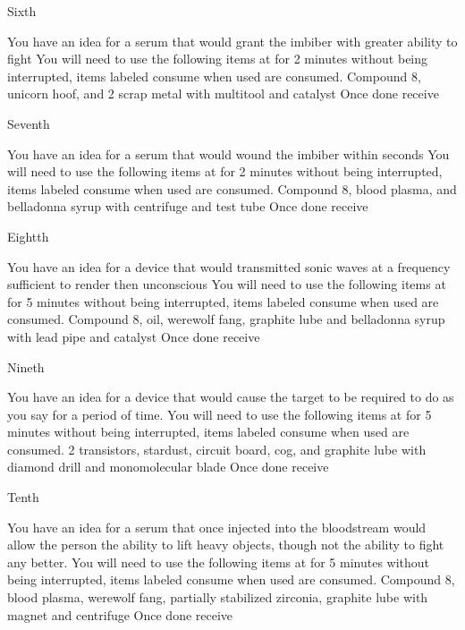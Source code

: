 \documentclass[greennotebook]{guildcamp3} %
\begin{document}
\begin{page}{Sixth}
	
	You have an idea for a serum that would grant the imbiber with greater ability to fight
	You will need to use the following items at \sSciWorkbench{} for 2 minutes without being interrupted, items labeled consume when used are consumed.
	Compound 8, unicorn hoof, and 2 scrap metal with multitool and catalyst
	Once done receive \iCRUpSerum{}
	
\end{page}

\begin{page}{Seventh}
	
	You have an idea for a serum that would wound the imbiber within seconds
	You will need to use the following items at \sSciWorkbench{} for 2 minutes without being interrupted, items labeled consume when used are consumed.
	Compound 8, blood plasma, and belladonna syrup with centrifuge and test tube
	Once done receive \iTechPoison{}
	
\end{page}

\begin{page}{Eightth}
	
	You have an idea for a device that would transmitted sonic waves at a frequency sufficient to render then unconscious
	You will need to use the following items at \sSciWorkbench{} for 5 minutes without being interrupted, items labeled consume when used are consumed.
	Compound 8, oil, werewolf fang, graphite lube and belladonna syrup with lead pipe and catalyst
	Once done receive \iSonicKO{}
	
\end{page}

\begin{page}{Nineth}
	
	You have an idea for a device that would cause the target to be required to do as you say for a period of time.
	You will need to use the following items at \sSciWorkbench{} for 5 minutes without being interrupted, items labeled consume when used are consumed.
	2 transistors, stardust, circuit board, cog, and graphite lube with diamond drill and monomolecular blade
	Once done receive \iMCDevice{}
	
\end{page}

\begin{page}{Tenth}
	
	You have an idea for a serum that once injected into the bloodstream would allow the person the ability to lift heavy objects, though not the ability to fight any better.
	You will need to use the following items at \sSciWorkbench{} for 5 minutes without being interrupted, items labeled consume when used are consumed.
	Compound 8, blood plasma, werewolf fang, partially stabilized zirconia, graphite lube with magnet and centrifuge
	Once done receive \iSteroids{}
	
\end{page}
\end{document}
